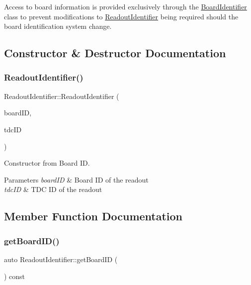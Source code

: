 Access to board information is provided exclusively through the \hyperlink{class_board_identifier}{Board\+Identifier} class to prevent modifications to \hyperlink{class_readout_identifier}{Readout\+Identifier} being required should the board identification system change. 

\subsection{Constructor \& Destructor Documentation}
\mbox{\label{class_readout_identifier_a6dbfa3a186abade180d962aa22c81e71}} 
\subsubsection{\texorpdfstring{Readout\+Identifier()}{ReadoutIdentifier()}}
{\footnotesize\ttfamily Readout\+Identifier\+::\+Readout\+Identifier (\begin{DoxyParamCaption}\item[{const \hyperlink{class_board_identifier}{Board\+Identifier} \&}]{board\+ID,  }\item[{const unsigned int}]{tdc\+ID }\end{DoxyParamCaption})}



Constructor from Board ID. 


\begin{DoxyParams}{Parameters}
{\em board\+ID} & Board ID of the readout \\
\hline
{\em tdc\+ID} & T\+DC ID of the readout \\
\hline
\end{DoxyParams}


\subsection{Member Function Documentation}
\mbox{\label{class_readout_identifier_ad5a9727c8ed4bd02883f6d68d0fadac8}} 
\subsubsection{\texorpdfstring{get\+Board\+I\+D()}{getBoardID()}}
{\footnotesize\ttfamily auto Readout\+Identifier\+::get\+Board\+ID (\begin{DoxyParamCaption}{ }\end{DoxyParamCaption}) const\hspace{0.3cm}{\ttfamily [inline]}}



